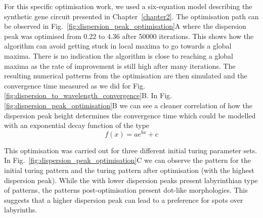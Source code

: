For this specific optimisation work, we used a six-equation model describing the synthetic gene circuit presented in Chapter~\ref{chapter2}.
The optimisation path can be observed in Fig.~\ref{fig:dispersion_peak_optimisation}A where the dispersion peak was optimised from 0.22 to 4.36 after 50000 iterations.
This shows how the algorithm can avoid getting stuck in local maxima to go towards a global maxima.
There is no indication the algorithm is close to reaching a global maxima as the rate of improvement is still high after many iterations.
The resulting numerical patterns from the optimisation are then simulated and the convergence time measured as we did for Fig. \ref{fig:dispersion_to_wavelength_convergence}B. In Fig. \ref{fig:dispersion_peak_optimisation}B we can see a cleaner correlation of how the dispersion peak height determines the convergence time which could be modelled with an exponential decay function of the type
\begin{equation}
    f(x) = ae^{bx} + c
\end{equation}

This optimisation was carried out for three different initial turing parameter sets. In Fig.~\ref{fig:dispersion_peak_optimisation}C we can observe the pattern for the initial turing pattern and the turing pattern after optimisation (with the highest dispersion peak).
While the with lower dispersion peaks present labyrinthian type of patterns, the patterns post-optimisation present dot-like morphologies.
This suggests that a higher dispersion peak can lead to a preference for spots over labyrinths.


